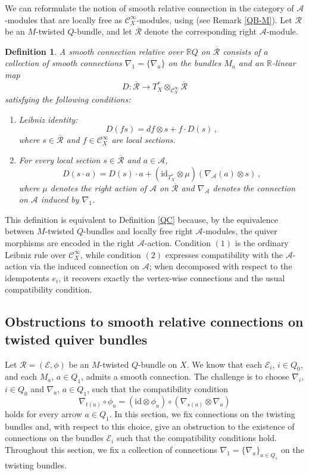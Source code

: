 \documentclass[12pt, reqno]{amsart}
\theoremstyle{plain}
\newtheorem{definition}[theorem]{Definition}
\numberwithin{equation}{section}
\begin{document}
We can reformulate the notion of smooth relative connection in the category of $\mathcal{A}$-modules that are locally free as $\mathcal{C}^\infty_X$-modules, using \cite[Proposition~5.1]{AG} (see Remark \ref{QB-M}). Let $\mathcal{R}$ be an $M$-twisted $Q$-bundle, and let $\overline{\mathcal{R}}$ denote the corresponding right $\mathcal{A}$-module.
	
	\begin{definition}\label{MC}
		\rm  A \emph{smooth connection relative over $\mathbb{R}Q$} on $\overline{\mathcal{R}}$ consists of a collection of smooth connections $\nabla_{1}=\{\nabla_{a}\}$ on the bundles $M_a$ and an $\mathbb{R}$-linear map
	$$D: \overline{\mathcal{R}}\longrightarrow T_X^* \otimes_{\mathcal{C}^\infty_X} \overline{\mathcal{R}}$$
		satisfying the following conditions: 
		\begin{enumerate}
			\item Leibniz identity:
			$$D(fs)= df \otimes s + f \cdot D(s)\,,$$
			where $s \in \overline{\mathcal{R}}$ and $f \in \mathcal{C}_X^{\infty}$ are local sections.
			\item For every local section $s \in \overline{\mathcal{R}}$ and $a\in \mathcal{A}$,
			$$D(s\cdot a)= D(s)\cdot a + (\mathrm{id}_{T_X^*}\otimes \mu)(\nabla_{\mathcal{A}}(a)\otimes s)\,,$$
			where $\mu$ denotes the right action of $\mathcal{A}$ on $\overline{\mathcal{R}}$ and $\nabla_{\mathcal{A}}$ denotes the connection on $\mathcal{A}$ induced by $\nabla_{1}$.
		\end{enumerate}
	\end{definition}

This definition is equivalent to Definition \ref{QC} because, by the equivalence between $M$-twisted $Q$-bundles and locally free right $\mathcal{A}$-modules, the quiver morphisms are encoded in the right $\mathcal{A}$-action. Condition $(1)$ is the ordinary Leibniz rule over $\mathcal{C}^\infty_X$, while condition $(2)$ expresses compatibility with the $\mathcal{A}$-action via the induced connection on $\mathcal{A}$; when decomposed with respect to the idempotents $e_i$, it recovers exactly the vertex-wise connections and the usual compatibility condition.

	
\subsection{Obstructions to smooth relative connections on  twisted quiver bundles}	
	Let $\mathcal{R}=(\mathcal{E},\phi)$ be an $M$-twisted $Q$-bundle on $X$. We know that each $\mathcal{E}_{i}$, $i\in Q_0$, and each $M_a$, $a\in Q_1$, admits a smooth connection. The challenge is to choose $\nabla_i$, $i\in Q_0$ and $\nabla_a$, $a\in Q_1$, such that the compatibility condition 
	$$\nabla_{t(a)} \circ \phi_{a} = (\mathrm{id} \otimes \phi_{a}) \circ (\nabla_{s(a)}\otimes \nabla_a)$$
	holds for every arrow $a \in Q_{1}$. In this section, we fix connections on the twisting bundles and, with respect to this choice, give an obstruction to the existence of connections on the bundles $\mathcal{E}_i$ such that the compatibility conditions hold. Throughout this section, we fix a collection of connections $\nabla_{1}=\{\nabla_{a}\}_{a\in Q_1}$ on the twisting bundles.
	
\end{document}
